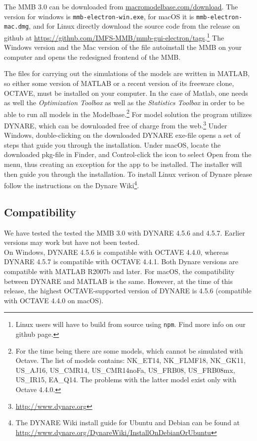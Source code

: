 The MMB 3.0 can be downloaded from \url{macromodelbase.com/download}. The version for windows is \texttt{mmb-electron-win.exe}, for macOS it is \texttt{mmb-electron-mac.dmg}, and for Linux directly download the source code from the release on github at
\url{https://github.com/IMFS-MMB/mmb-gui-electron/tags}.\footnote{Linux users will have to build from source using \texttt{npm}. Find more info on our github page.}
The Windows version and the Mac version of the file autoinstall the MMB on your computer and opens the redesigned frontend of the MMB. 

The files for carrying out the simulations of the models are written in MATLAB, so either some version of MATLAB or a recent version of its freeware clone, OCTAVE, must be installed on your computer. In the case of Matlab, one needs as well the \textit{Optimization Toolbox} as well as the \textit{Statistics Toolbox} in order to be able to run all models in the Modelbase.\footnote{For the time being there are some models, which cannot be simulated with Octave. The list of models contains: NK\_ET14, NK\_FLMF18, NK\_GK11, US\_AJ16, US\_CMR14, US\_CMR14noFa, US\_FRB08, US\_FRB08mx, US\_IR15, EA\_Q14. The problems with the latter model exist only with Octave 4.4.0.}
For model solution the program utilizes DYNARE, which can be downloaded free of charge from the web.\footnote{\url{http://www.dynare.org}} Under Windows, double-clicking on the downloaded DYNARE exe-file opens a set of steps that guide you through the installation. Under macOS, locate the downloaded pkg-file in Finder, and Control-click the icon to select Open from the menu, thus creating an exception for the app to be installed. The installer will then guide you through the installation. To install Linux verison of Dynare please follow the instructions on the Dynare Wiki\footnote{The DYNARE Wiki install guide for Ubuntu and Debian can be found at \url{http://www.dynare.org/DynareWiki/InstallOnDebianOrUbuntu}}.

\subsection*{Compatibility}
We have tested the tested the MMB 3.0 with DYNARE 4.5.6 and 4.5.7. Earlier versions may work but have not been tested.\\
On Windows, DYNARE 4.5.6 is compatible with OCTAVE 4.4.0, whereas DYNARE 4.5.7 is compatible with OCTAVE 4.4.1. Both Dynare versions are compatible with  MATLAB R2007b and later. For macOS, the compatibility between DYNARE and MATLAB is the same. However, at the time of this release, the highest OCTAVE-supported version of DYNARE is 4.5.6 (compatible with OCTAVE 4.4.0 on macOS).\\


